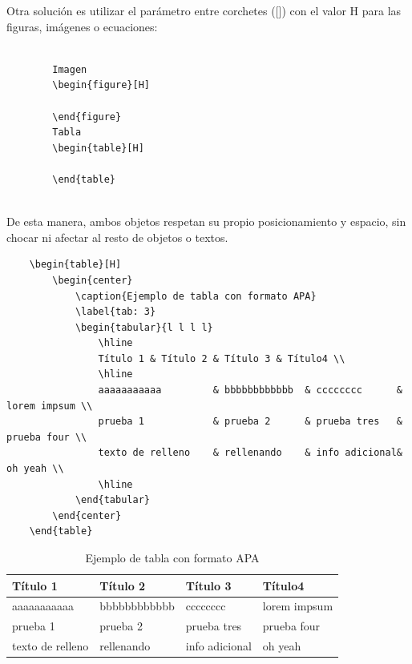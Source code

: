 Otra solución es utilizar el parámetro entre corchetes ([]) con el valor H para las figuras, imágenes o ecuaciones:
\begin{lstlisting}
    
        Imagen
        \begin{figure}[H]
        
        \end{figure}
        Tabla
        \begin{table}[H]
        
        \end{table}
    
\end{lstlisting}

De esta manera, ambos objetos respetan su propio posicionamiento y espacio, sin chocar ni afectar al resto de objetos o textos.
\begin{lstlisting}
    \begin{table}[H]
        \begin{center}
            \caption{Ejemplo de tabla con formato APA}
            \label{tab: 3}
            \begin{tabular}{l l l l}
                \hline
                Título 1 & Título 2 & Título 3 & Título4 \\
                \hline
                aaaaaaaaaaa         & bbbbbbbbbbbb  & cccccccc      & lorem impsum \\
                prueba 1            & prueba 2      & prueba tres   & prueba four \\
                texto de relleno    & rellenando    & info adicional& oh yeah \\
                \hline
            \end{tabular}
        \end{center}
    \end{table}
\end{lstlisting}
\begin{table}[H]
    \begin{center}
        \caption{Ejemplo de tabla con formato APA}
        \label{tab: 3}
        \begin{tabular}{l l l l}
            \hline
            Título 1 & Título 2 & Título 3 & Título4 \\
            \hline
            aaaaaaaaaaa         & bbbbbbbbbbbb  & cccccccc      & lorem impsum \\
            prueba 1            & prueba 2      & prueba tres   & prueba four \\
            texto de relleno    & rellenando    & info adicional& oh yeah \\
            \hline
        \end{tabular}
    \end{center}
\end{table}

